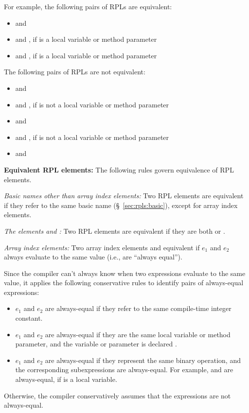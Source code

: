 For example, the following pairs of RPLs are equivalent:
%
\begin{itemize}
%
\item {} and 
%
\item {} and , if  is a 
  local variable or method parameter
%
\item {} and , if  is a
 local variable or method parameter
%
\end{itemize}
%
The following pairs of RPLs are not equivalent:
%
\begin{itemize}
%
\item {} and 
%
\item {} and , if  is not a
   local variable or method parameter
%
\item {} and 
%
\item {} and , if  is not a 
  local variable or method parameter
%
\item {} and 
%
\end{itemize}

\noindent
\textbf{Equivalent RPL elements:} The following rules govern
equivalence of RPL elements.

\noindent
\textit{Basic names other than array index elements:} Two RPL elements
are equivalent if they refer to the same basic name
(\S~\ref{sec:rpls:basic}), except for array index elements.

\noindent
\textit{The elements \kwd{*} and \kwd{[?]}:} Two RPL elements are
equivalent if they are both \kwd{*} or \kwd{[?]}.

\noindent
\textit{Array index elements:} Two array index elements \kwd{[$e_1$]}
and \kwd{[$e_2$]} equivalent if $e_1$ and $e_2$ always evaluate to the
same value (i.e., are ``always equal'').

Since the compiler can't always know when two expressions evaluate to
the same value, it applies the following conservative rules to
identify pairs of always-equal expressions:
%
\begin{itemize}
%
\item $e_1$ and $e_2$ are always-equal if they refer to the same
  compile-time integer constant.
%
\item $e_1$ and $e_2$ are always-equal if they are the same local
  variable or method parameter, and the variable or parameter is
  declared .
%
\item $e_1$ and $e_2$ are always-equal if they represent the same
  binary operation, and the corresponding subexpressions are
  always-equal.  For example,  and  are
  always-equal, if  is a  local variable.
\end{itemize}
%
Otherwise, the compiler conservatively assumes that the expressions
are not always-equal.


